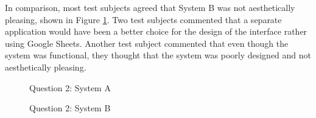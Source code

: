 In comparison, most test subjects agreed that System B was not aesthetically pleasing, shown in Figure \ref{fig:finalQ2Kaizen}. Two test subjects commented that a separate application would have been a better choice for the design of the interface rather using Google Sheets. Another test subject commented that even though the system was functional, they thought that the system was poorly designed and not aesthetically pleasing. \newline

\begin{figure}[!h]
  \centering
  \begin{minipage}[b]{0.47\textwidth}
    \caption{Question 2: System A}
    \label{fig:finalQ2Bioschemas}
  \end{minipage}
  \hfill
  \begin{minipage}[b]{0.47\textwidth}
    \caption{Question 2: System B}
    \label{fig:finalQ2Kaizen}
  \end{minipage}
\end{figure}


